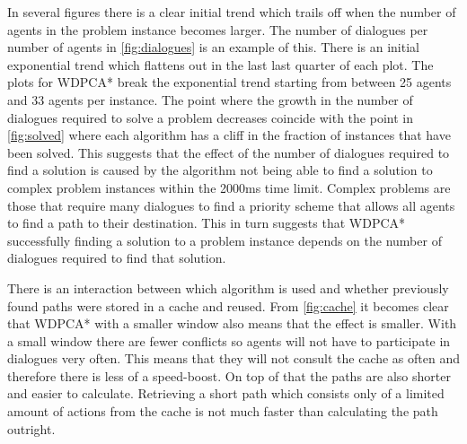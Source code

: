 In several figures there is a clear initial trend which trails off when the
number of agents in the problem instance becomes larger. The number of
dialogues per number of agents in \autoref{fig:dialogues} is an example of
this. There is an initial exponential trend which flattens out in the last last
quarter of each plot. The plots for WDPCA* break the exponential trend starting
from between 25 agents and 33 agents per instance. The point where the growth
in the number of dialogues required to solve a problem decreases coincide with
the point in \autoref{fig:solved} where each algorithm has a cliff in the
fraction of instances that have been solved. This suggests that the effect of
the number of dialogues required to find a solution is caused by the algorithm
not being able to find a
solution to complex problem instances within the 2000ms time limit. Complex
problems are those that require many dialogues to find a priority scheme that
allows all agents to find a path to their destination. This in turn suggests
that WDPCA* successfully finding a solution to a problem instance depends on the
number of dialogues required to find that solution.

There is an interaction between which algorithm is used and whether previously
found paths were stored in a cache and reused. From \autoref{fig:cache} it
becomes clear that WDPCA* with a smaller window also means that the effect is
smaller. With a small window there are fewer conflicts so agents will not have
to participate in dialogues very often. This means that they will not consult
the cache as often and therefore there is less of a speed-boost. On top of that
the paths are also shorter and easier to calculate. Retrieving a short path
which consists only of a limited amount of actions from the cache is not much
faster than calculating the path outright.

